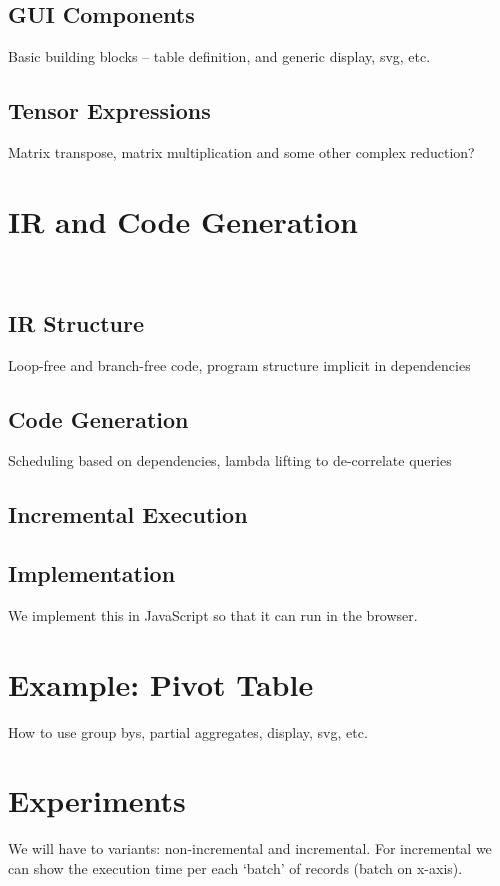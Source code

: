 \documentclass[runningheads]{llncs}
\begin{document}
\subsection{GUI Components}
Basic building blocks -- table definition, and generic display, svg, etc. 

\subsection{Tensor Expressions}
Matrix transpose, matrix multiplication and some other complex reduction?

\section{IR and Code Generation}~\label{sec:ir_codegen}
\subsection{IR Structure}
Loop-free and branch-free code, program structure implicit in dependencies

\subsection{Code Generation}
Scheduling based on dependencies, lambda lifting to de-correlate queries

\subsection{Incremental Execution}

\subsection{Implementation}
We implement this in JavaScript so that it can run in the browser.


\section{Example: Pivot Table}\label{sec:case_study}
How to use group bys, partial aggregates, display, svg, etc.

\section{Experiments}\label{sec:experiments}
We will have to variants: non-incremental and incremental.
For incremental we can show the execution time per each `batch' of
records (batch on x-axis).
\end{document}
